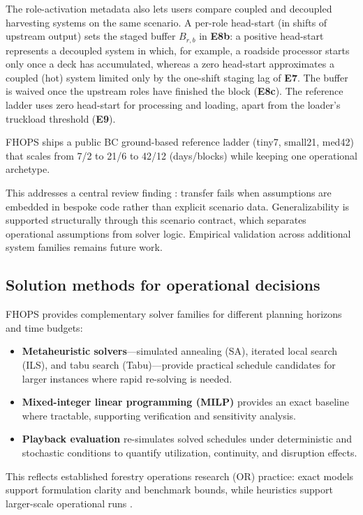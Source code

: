 The role-activation metadata also lets users compare coupled and decoupled harvesting systems on the same scenario. A per-role head-start (in shifts of upstream output) sets the staged buffer $B_{r,b}$ in \textbf{E8b}: a positive head-start represents a decoupled system in which, for example, a roadside processor starts only once a deck has accumulated, whereas a zero head-start approximates a coupled (hot) system limited only by the one-shift staging lag of \textbf{E7}. The buffer is waived once the upstream roles have finished the block (\textbf{E8c}). The reference ladder uses zero head-start for processing and loading, apart from the loader's truckload threshold (\textbf{E9}).

FHOPS ships a public BC ground-based reference ladder (tiny7, small21, med42) that scales from 7/2 to 21/6 to 42/12 (days/blocks) while keeping one operational archetype.

This addresses a central review finding \cite{jaffray2026systematic}: transfer fails when assumptions are embedded in bespoke code rather than explicit scenario data. Generalizability is supported structurally through this scenario contract, which separates operational assumptions from solver logic. Empirical validation across additional system families remains future work.

\subsection{Solution methods for operational decisions}
FHOPS provides complementary solver families for different planning horizons and time budgets:
\begin{itemize}
  \item \textbf{Metaheuristic solvers}---simulated annealing (SA), iterated local search (ILS), and tabu search (Tabu)---provide practical schedule candidates for larger instances where rapid re-solving is needed.
  \item \textbf{Mixed-integer linear programming (MILP)} provides an exact baseline where tractable, supporting verification and sensitivity analysis.
  \item \textbf{Playback evaluation} re-simulates solved schedules under deterministic and stochastic conditions to quantify utilization, continuity, and disruption effects.
\end{itemize}

This reflects established forestry operations research (OR) practice: exact models support formulation clarity and benchmark bounds, while heuristics support larger-scale operational runs \cite{paradis2018bilevel,nelson2003forestmodels}.

